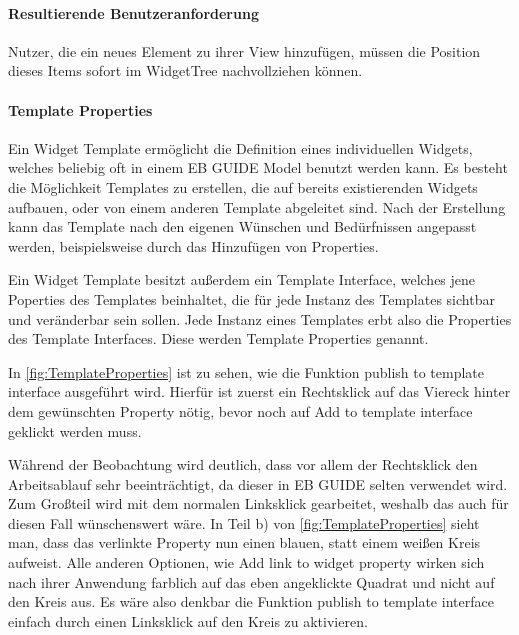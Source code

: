 \paragraph{Resultierende Benutzeranforderung}
Nutzer, die ein neues Element zu ihrer View hinzufügen, müssen die Position dieses Items sofort im WidgetTree nachvollziehen können.

\paragraph{Template Properties}
Ein Widget Template ermöglicht die Definition eines individuellen Widgets, welches beliebig oft in einem EB GUIDE Model benutzt werden kann.
Es besteht die Möglichkeit Templates zu erstellen, die auf bereits existierenden Widgets aufbauen, oder von einem anderen Template abgeleitet sind.
Nach der Erstellung kann das Template nach den eigenen Wünschen und Bedürfnissen angepasst werden, beispielsweise durch das Hinzufügen von Properties.

Ein Widget Template besitzt außerdem ein Template Interface, welches jene Poperties des Templates beinhaltet, die für jede Instanz des Templates sichtbar und veränderbar sein sollen.
Jede Instanz eines Templates erbt also die Properties des Template Interfaces.
Diese werden Template Properties genannt.\cite{studio_guide}

In \cref{fig:TemplateProperties} ist zu sehen, wie die Funktion  \glqq publish to template interface\grqq{} ausgeführt wird.
Hierfür ist zuerst ein Rechtsklick auf das Viereck hinter dem gewünschten Property nötig, bevor noch auf Add to template interface geklickt werden muss.

Während der Beobachtung wird deutlich, dass vor allem der Rechtsklick den Arbeitsablauf sehr beeinträchtigt, da dieser in EB GUIDE selten verwendet wird. 
Zum Großteil wird mit dem normalen Linksklick gearbeitet, weshalb das auch für diesen Fall wünschenswert wäre.
In Teil b) von \cref{fig:TemplateProperties} sieht man, dass das verlinkte Property nun einen blauen, statt einem weißen Kreis aufweist.
Alle anderen Optionen, wie  \glqq Add link to widget property\grqq{} wirken sich nach ihrer Anwendung farblich auf das eben angeklickte Quadrat und nicht auf den Kreis aus.
Es wäre also denkbar die Funktion \glqq publish to template interface\grqq{} einfach durch einen Linksklick auf den Kreis zu aktivieren.


